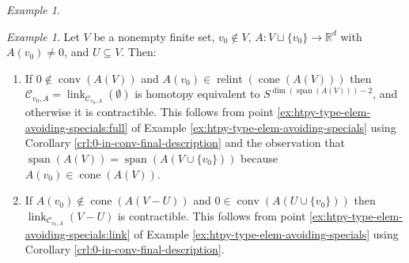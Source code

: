 \documentclass[a4paper,11pt,reqno, english]{amsart}
\theoremstyle{definition}
\theoremstyle{remark}
\newtheorem{example}[theorem]{Example}
\newcommand\R{\mathbb R}
\DeclareMathOperator{\link}{\mathrm{link}}
\DeclareMathOperator{\cone}{\mathrm{cone}}
\DeclareMathOperator{\relint}{\mathrm{relint}}
\DeclareMathOperator{\conv}{\mathrm{conv}}
\begin{document}
\begin{example}
\begin{enumerate}[label=\normalfont{(\arabic*)}]
    \end{enumerate}
\end{example}
\begin{example}
    Let $V$ be a nonempty finite set, $v_0\notin V$, $A\colon {V\sqcup\{v_0\}}\to\R^d$ with $A(v_0)\neq 0$, and $U\subseteq V$. Then:
    \begin{enumerate}[label=\normalfont{(\arabic*)}]
        \item If $0\notin\conv(A(V))$ and $A(v_0)\in\relint(\cone(A(V)))$ then $\mathscr{C}_{v_0,A}=\link_{\mathscr{C}_{v_0,A}}(\emptyset)$ is homotopy equivalent to $S^{\dim(\operatorname{span}(A(V)))-2}$, and otherwise it is contractible. This follows from point \ref{ex:htpy-type-elem-avoiding-specials:full} of Example \ref{ex:htpy-type-elem-avoiding-specials} using Corollary \ref{crl:0-in-conv-final-description} and the observation that $\operatorname{span}(A(V))=\operatorname{span}(A(V\cup\{v_0\}))$ because $A(v_0)\in\cone(A(V))$.
        \item If $A(v_0)\notin\cone(A(V-U))$ and $0\in\conv(A(U\cup\{v_0\}))$ then $\link_{\mathscr{C}_{v_0,A}}(V-U)$ is contractible. This follows from point \ref{ex:htpy-type-elem-avoiding-specials:link} of Example \ref{ex:htpy-type-elem-avoiding-specials} using Corollary \ref{crl:0-in-conv-final-description}.
    \end{enumerate}
\end{example}
\end{document}
